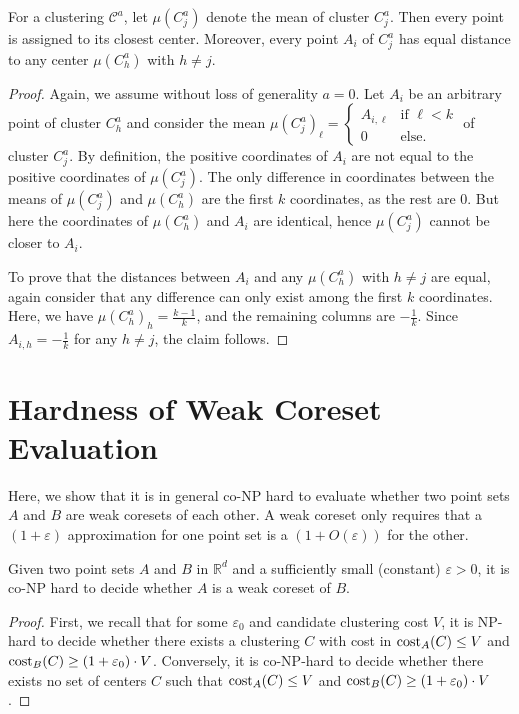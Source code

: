 \begin{fact}
\label{fact:opt}
For a clustering $\mathcal{C}^{a}$, let $\mu(C_j^{a})$ denote the mean of cluster $C_j^a$. Then every point  is assigned to its closest center. Moreover, every point $A_i$ of $C_j^a$ has equal distance to any center $\mu(C_h^{a})$ with $h\neq j$.
\end{fact}
\begin{proof}
Again, we assume without loss of generality $a=0$.
Let $A_i$ be an arbitrary point of cluster $C_{h}^{a}$ and consider the mean $\mu(C_j^a)_{\ell} = \begin{cases}A_{i,\ell} &\text{if }\ell<k \\
0 &\text{else.}\end{cases}$ of cluster $C_j^a$. By definition, the positive coordinates of $A_i$ are not equal to the positive coordinates of $\mu(C_j^a)$. The only difference in coordinates between the means of $\mu(C_j^a)$ and $\mu(C_h^a)$ are the first $k$ coordinates, as the rest are $0$.
But here the coordinates of $\mu(C_h^a)$ and $A_i$ are identical, hence $\mu(C_j^a)$ cannot be closer to $A_i$.

To prove that the distances between $A_i$ and any $\mu(C_h^{a})$ with $h\neq j$ are equal, again consider that any difference can only exist among the first $k$ coordinates. Here, we have $\mu(C_h^{a})_h = \frac{k-1}{k}$, and the remaining columns are $-\frac{1}{k}$. Since $A_{i,h} = -\frac{1}{k}$ for any $h\neq j$, the claim follows.
\end{proof}

\section{Hardness of Weak Coreset Evaluation}

Here, we show that it is in general co-NP hard to evaluate whether two point sets $A$ and $B$ are weak coresets of each other. A weak coreset only requires that a $(1+\varepsilon)$ approximation for one point set is a $(1+O(\varepsilon))$ for the other.


\begin{proposition}
\label{prop:hardness}
Given two point sets $A$ and $B$ in $\mathbb{R}^d$ and a sufficiently small (constant) $\varepsilon>0$, it is co-NP hard to decide whether $A$ is a weak coreset of $B$.
\end{proposition}
\begin{proof}
First, we recall that for some $\varepsilon_0$ and candidate clustering cost $V$, it is NP-hard to decide whether there exists a clustering $C$ with cost in $\text{cost}_A(C)\leq V$ and $\text{cost}_B(C)\geq (1+\varepsilon_0)\cdot V$.
Conversely, it is co-NP-hard to decide whether there exists no set of centers $C$ such that $\text{cost}_A(C)\leq V$ and $\text{cost}_B(C) \geq (1+\varepsilon_0)\cdot V$.
\end{proof}


